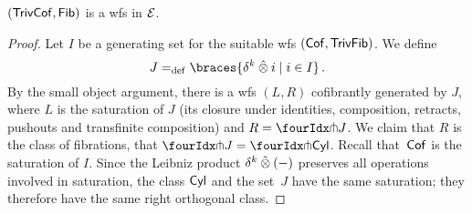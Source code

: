 \documentclass[reqno,10pt,a4paper,oneside,draft]{amsart}
\begin{document}
\begin{proposition} \label{thm:wfstimes}
$(\TrivCof, \Fib)$ is a wfs in $\cal{E}$.
\end{proposition}

\begin{proof}
Let $I$ be a generating set for the suitable wfs $(\Cof, \TrivFib)$.
We define
\[
J \defeq \braces{\delta^k \hatotimes i \mid i \in I}
\, .\]
By the small object argument, there is a wfs $(L, R)$ cofibrantly generated by $J$, where $L$ is the saturation of $J$ (\ie its closure under identities, composition, retracts, pushouts and transfinite composition) and $R = \liftr{J}$.
We claim that $R$ is the class of fibrations, \ie that $\liftr{J} = \liftr{\Cyl}$.
Recall that~$\Cof$ is the saturation of $I$.
Since the Leibniz product $\kcyl \hatotimes (-)$ preserves all operations involved in saturation, the class $\Cyl$ and the set~$J$ have the same saturation; they therefore have the same right orthogonal class.
\end{proof}
\end{document}
